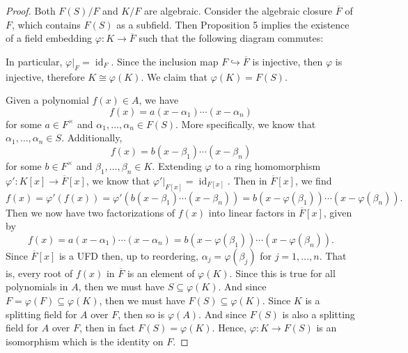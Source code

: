 \documentclass[12pt]{article}
\theoremstyle{definition}
\renewcommand{\phi}{\varphi}
\DeclareMathOperator{\id}{id}
\newcommand{\isom}{\cong}
\newcommand{\clo}{\overline}
\begin{document}
\begin{proof}
    Both $F(S)/F$ and $K/F$ are algebraic. Consider the algebraic closure $\clo{F}$ of $F$, which contains $F(S)$ as a subfield. Then Proposition 5 implies the existence of a field embedding $\phi : K \to \clo{F}$ such that the following diagram commutes:
    \begin{center}
    \end{center}
    In particular, $\phi|_F = \id_F$. Since the inclusion map $F \hookrightarrow \clo{F}$ is injective, then $\phi$ is injective, therefore $K \isom \phi(K)$. We claim that $\phi(K) = F(S)$.


    Given a polynomial $f(x) \in A$, we have
    \[
        f(x) = a(x - \alpha_1) \cdots (x - \alpha_n)
    \]
    for some $a \in F^\times$ and $\alpha_1, \dots, \alpha_n \in F(S)$. More specifically, we know that $\alpha_1, \dots, \alpha_n \in S$. Additionally,
    \[
        f(x) = b(x - \beta_1) \cdots (x - \beta_n)
    \]
    for some $b \in F^\times$ and $\beta_1, \dots, \beta_n \in K$. Extending $\phi$ to a ring homomorphism $\phi' : K[x] \to \clo{F}[x]$, we know that $\phi'|_{F[x]} = \id_{F[x]}$. Then in $\clo{F}[x]$, we find
    \[
        f(x) 
            = \phi'(f(x))
            = \phi'(b(x - \beta_1) \cdots (x - \beta_n)) 
            = b(x - \phi(\beta_1)) \cdots (x - \phi(\beta_n)).
    \]
    Then we now have two factorizations of $f(x)$ into linear factors in $\clo{F}[x]$, given by
    \[
        f(x) = a(x - \alpha_1) \cdots (x - \alpha_n) = b(x - \phi(\beta_1)) \cdots (x - \phi(\beta_n)).
    \]
    Since $\clo{F}[x]$ is a UFD then, up to reordering, $\alpha_j = \phi(\beta_j)$ for $j = 1, \dots, n$. That is, every root of $f(x)$ in $\clo{F}$ is an element of $\phi(K)$. Since this is true for all polynomials in $A$, then we must have $S \subseteq \phi(K)$. And since $F = \phi(F) \subseteq \phi(K)$, then we must have $F(S) \subseteq \phi(K)$. Since $K$ is a splitting field for $A$ over $F$, then so is $\phi(A)$. And since $F(S)$ is also a splitting field for $A$ over $F$, then in fact $F(S) = \phi(K)$. Hence, $\phi : K \to F(S)$ is an isomorphism which is the identity on $F$. 

\end{proof}
\end{document}
